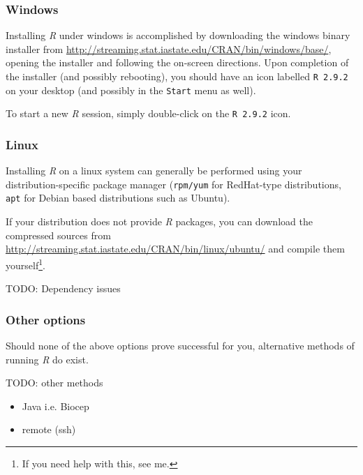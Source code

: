 \documentclass[10pt,letterpaper]{article}
\newcommand{\TODO}[1]{\textcolor{simpleRed}{TODO: #1}}
\begin{document}

\subsubsection{Windows} %
\label{ssub:windows}

Installing \emph{R} under windows is accomplished by downloading the windows binary installer from \url{http://streaming.stat.iastate.edu/CRAN/bin/windows/base/}, opening the installer and following the on-screen directions.  Upon completion of the installer (and possibly rebooting), you should have an icon labelled \texttt{R 2.9.2} on your desktop (and possibly in the \texttt{Start} menu as well).

To start a new \emph{R} session, simply double-click on the \texttt{R 2.9.2} icon.

\subsubsection{Linux} %
\label{ssub:linux}

Installing \emph{R} on a linux system can generally be performed using your distribution-specific package manager (\texttt{rpm/yum} for RedHat-type distributions, \texttt{apt} for Debian based distributions such as Ubuntu).

If your distribution does not provide \emph{R} packages, you can download the compressed sources from \url{http://streaming.stat.iastate.edu/CRAN/bin/linux/ubuntu/} and compile them yourself\footnote{If you need help with this, see me.}.


\TODO{Dependency issues}


\subsubsection{Other options} %
\label{ssub:other_options}

Should none of the above options prove successful for you, alternative methods of running \emph{R} do exist.

\TODO{other methods}

\begin{itemize}
    \item Java i.e. Biocep
    \item remote (ssh)
\end{itemize}
\end{document}
